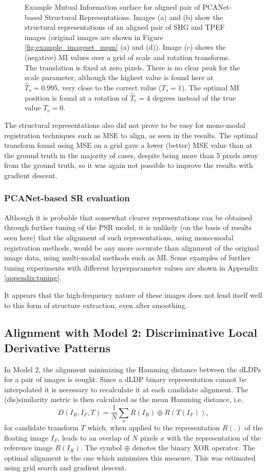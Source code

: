 \documentclass{report}
\begin{document}
\begin{figure}
\caption{Example Mutual Information surface for aligned pair of PCANet-based Structural Representations. Images (a) and (b) show the structural representations of an aligned pair of SHG and TPEF images (original images are shown in Figure \ref{fig:example_imageset_mpm} (a) and (d)). Image (c) shows the (negative) MI values over a grid of scale and rotation transforms. The translation is fixed at zero pixels. There is no clear peak for the scale parameter, although the highest value is found here at $\hat{T}_s = 0.995$, very close to the correct value ($T_s = 1$). The optimal MI position is found at a rotation of $\hat{T}_r = 4$ degrees instead of the true value $T_r = 0$.}
\label{fig:MIsurfacePSR}
\end{figure}

The structural representations also did not prove to be easy for mono-modal registration techniques such as MSE %
to align, as seen in the results. The optimal transform found using MSE on a grid gave a lower (better) MSE value than at the ground truth in the majority of cases, despite being more than 5 pixels away from the ground truth, so it was again not possible to improve the results with gradient descent.

\subsubsection{PCANet-based SR evaluation}
Although it is probable that somewhat clearer representations can be obtained through further tuning of the PSR model, it is unlikely (on the basis of results seen here) that the alignment of such representations, using mono-modal registration methods, would be any more accurate than alignment of the original image data, using multi-modal methods such as MI. Some examples of further tuning experiments with different hyperparameter values are shown in Appendix \ref{appendix:tuning}. 

It appears that the high-frequency nature of these images does not lend itself well to this form of structure extraction, even after smoothing.

\subsection{Alignment with Model 2: Discriminative Local Derivative Patterns}
\label{sec:model2_results}
In Model 2, the alignment minimizing the Hamming distance between the dLDPs for a pair of images is sought. Since a dLDP binary representation cannot be interpolated it is necessary to recalculate it at each candidate alignment. The (dis)similarity metric is then calculated as the mean Hamming distance, i.e.
\[
D(I_R, I_F, T) = \frac{1}{N} \sum_x R(I_R) \oplus R(T(I_F)),
\]
for candidate transform $T$ which, when applied to the representation $R(.)$ of the floating image $I_F$, leads to an overlap of $N$ pixels $x$ with the representation of the reference image $R(I_R)$. The symbol $\oplus$ denotes the binary XOR operator. The optimal alignment is the one which minimizes this measure. This was estimated using grid search and gradient descent.
\end{document}
